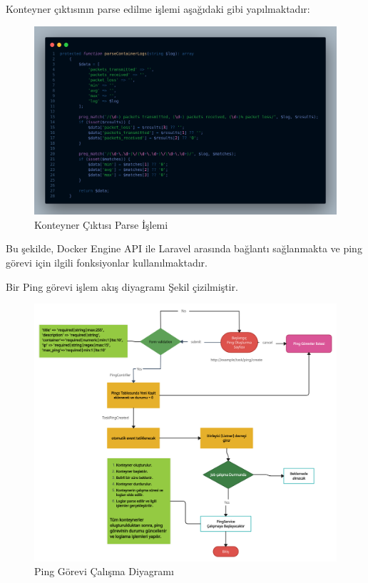 Konteyner çıktısının parse edilme işlemi aşağıdaki gibi yapılmaktadır:

\begin{figure}[H]
	\centering
	\includegraphics[width=0.8\linewidth]{images/code_parse.png}
	\caption{Konteyner Çıktısı Parse İşlemi}
	\label{fig:container_parse}
\end{figure}

Bu şekilde, Docker Engine API ile Laravel arasında bağlantı sağlanmakta ve ping görevi için ilgili fonksiyonlar kullanılmaktadır.

Bir Ping görevi işlem akış diyagramı Şekil çizilmiştir.
\begin{figure}[H]
	\centering
	\includegraphics[width=1.1\linewidth]{images/ping_task_diagram.png}
	\caption{Ping Görevi Çalışma Diyagramı}
	\label{fig:ping_task_diagram}
\end{figure}


